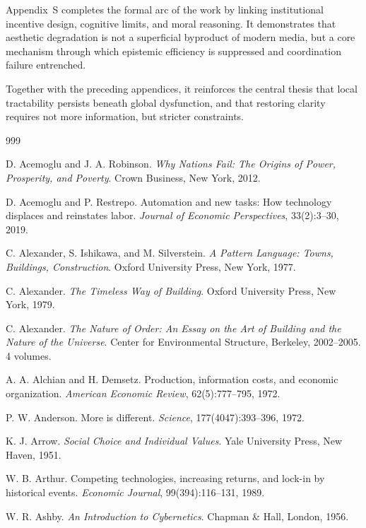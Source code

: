 \documentclass[11pt]{article}
\begin{document}
Appendix~S completes the formal arc of the work by linking institutional incentive design, cognitive limits, and moral reasoning. It demonstrates that aesthetic degradation is not a superficial byproduct of modern media, but a core mechanism through which epistemic efficiency is suppressed and coordination failure entrenched.

Together with the preceding appendices, it reinforces the central thesis that local tractability persists beneath global dysfunction, and that restoring clarity requires not more information, but stricter constraints.

\newpage
\begin{thebibliography}{999}

D. Acemoglu and J. A. Robinson.
\textit{Why Nations Fail: The Origins of Power, Prosperity, and Poverty}.
Crown Business, New York, 2012.

D. Acemoglu and P. Restrepo.
Automation and new tasks: How technology displaces and reinstates labor.
\textit{Journal of Economic Perspectives}, 33(2):3--30, 2019.

C. Alexander, S. Ishikawa, and M. Silverstein.
\textit{A Pattern Language: Towns, Buildings, Construction}.
Oxford University Press, New York, 1977.

C. Alexander.
\textit{The Timeless Way of Building}.
Oxford University Press, New York, 1979.

C. Alexander.
\textit{The Nature of Order: An Essay on the Art of Building and the Nature of the Universe}.
Center for Environmental Structure, Berkeley, 2002--2005. 4 volumes.

A. A. Alchian and H. Demsetz.
Production, information costs, and economic organization.
\textit{American Economic Review}, 62(5):777--795, 1972.

P. W. Anderson.
More is different.
\textit{Science}, 177(4047):393--396, 1972.

K. J. Arrow.
\textit{Social Choice and Individual Values}.
Yale University Press, New Haven, 1951.

W. B. Arthur.
Competing technologies, increasing returns, and lock-in by historical events.
\textit{Economic Journal}, 99(394):116--131, 1989.

W. R. Ashby.
\textit{An Introduction to Cybernetics}.
Chapman \& Hall, London, 1956.


\end{thebibliography}
\end{document}
